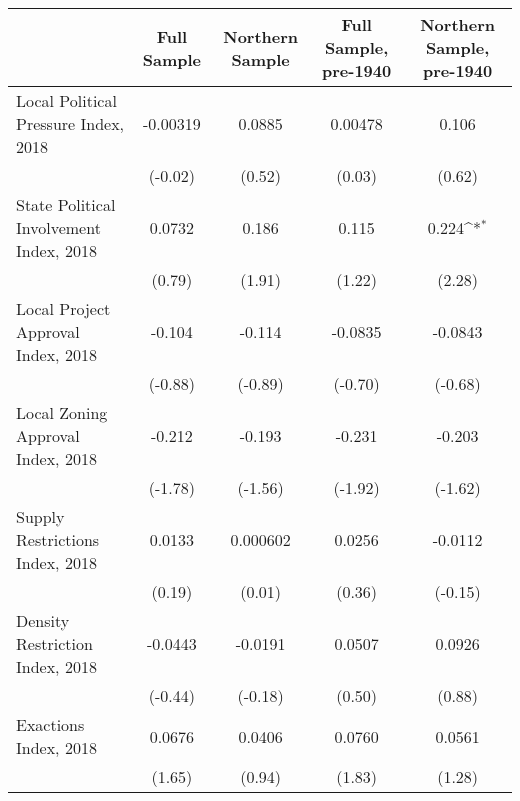 \begin{table}[htbp]\centering
\def\sym#1{\ifmmode^{#1}\else\(^{#1}\)\fi}
\caption{ \label{tab1}}
\begin{tabular}{l*{4}{c}}
\toprule
                    &\multicolumn{1}{c}{Full Sample}&\multicolumn{1}{c}{Northern Sample}&\multicolumn{1}{c}{Full Sample, pre-1940}&\multicolumn{1}{c}{Northern Sample, pre-1940}\\
\midrule
Local Political Pressure Index, 2018&    -0.00319         &      0.0885         &     0.00478         &       0.106         \\
                    &     (-0.02)         &      (0.52)         &      (0.03)         &      (0.62)         \\
\addlinespace
State Political Involvement Index, 2018&      0.0732         &       0.186         &       0.115         &       0.224\sym{*}  \\
                    &      (0.79)         &      (1.91)         &      (1.22)         &      (2.28)         \\
\addlinespace
Local Project Approval Index, 2018&      -0.104         &      -0.114         &     -0.0835         &     -0.0843         \\
                    &     (-0.88)         &     (-0.89)         &     (-0.70)         &     (-0.68)         \\
\addlinespace
Local Zoning Approval Index, 2018&      -0.212         &      -0.193         &      -0.231         &      -0.203         \\
                    &     (-1.78)         &     (-1.56)         &     (-1.92)         &     (-1.62)         \\
\addlinespace
Supply Restrictions Index, 2018&      0.0133         &    0.000602         &      0.0256         &     -0.0112         \\
                    &      (0.19)         &      (0.01)         &      (0.36)         &     (-0.15)         \\
\addlinespace
Density Restriction Index, 2018&     -0.0443         &     -0.0191         &      0.0507         &      0.0926         \\
                    &     (-0.44)         &     (-0.18)         &      (0.50)         &      (0.88)         \\
\addlinespace
Exactions Index, 2018&      0.0676         &      0.0406         &      0.0760         &      0.0561         \\
                    &      (1.65)         &      (0.94)         &      (1.83)         &      (1.28)         \\

\end{tabular}
\end{table}
